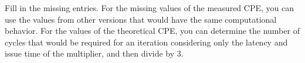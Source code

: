 Fill in the missing entries.  For the missing values of the measured
CPE, you can use the values from other versions that would have the
same computational behavior.  For the values of the theoretical CPE,
you can determine the number of cycles that would be required for an
iteration considering only the latency and issue time of the
multiplier, and then divide by 3.

%
%
%